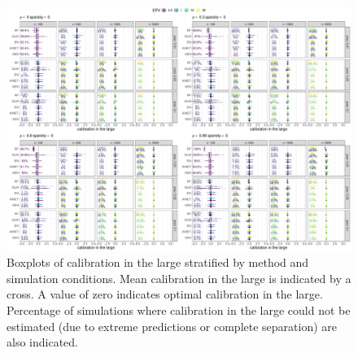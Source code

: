 \documentclass[a4paper, 11pt]{article}
\begin{document}
\begin{landscape}
\begin{figure}[!ht]
\center
\includegraphics[width=0.8\linewidth]{figures-appendix/calibration-clarge_sparsity0.pdf}
\caption{Boxplots of calibration in the large stratified by method and
  simulation conditions. Mean calibration in the large is indicated by a cross.
  A value of zero indicates optimal calibration in the large. Percentage of
  simulations where calibration in the large could not be estimated (due to
  extreme predictions or complete separation) are also
  indicated.} \label{fig:clarge}
\end{figure}
\end{landscape}
\end{document}
